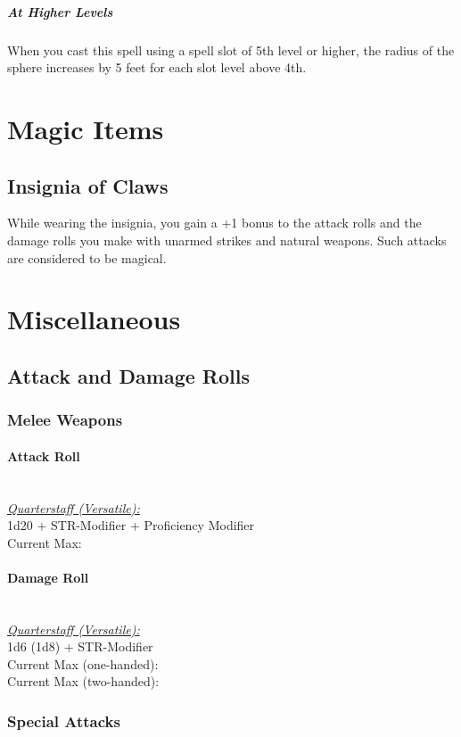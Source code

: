 {\subparagraph*{At Higher Levels} When you cast this spell using a spell slot of 5th level or higher, the radius of the sphere increases by 5 feet for each slot level above 4th.

\section*{Magic Items}
\subsection*{Insignia of Claws}
While wearing the insignia, you gain a +1 bonus to the attack rolls and the damage rolls you make with unarmed strikes and natural weapons. Such attacks are considered to be magical.

\section*{Miscellaneous}
\subsection*{Attack and Damage Rolls}
\subsubsection*{Melee Weapons}
\paragraph*{Attack Roll}\hfill\\
\underline{\textit{Quarterstaff (Versatile):}}\\
1d20 + STR-Modifier + Proficiency Modifier\\
\indent Current Max: 
\paragraph*{Damage Roll}\hfill\\
\underline{\textit{Quarterstaff (Versatile):}}\\
1d6 (1d8) + STR-Modifier\\
\indent Current Max (one-handed): \\
\indent Current Max (two-handed): 
\subsubsection*{Special Attacks}
}
